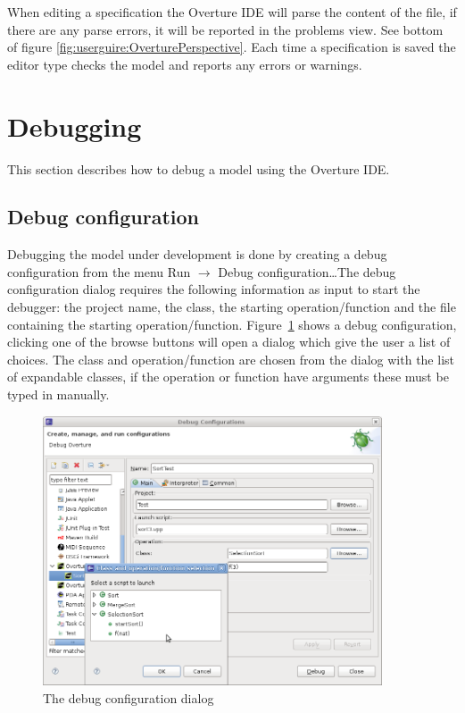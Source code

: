 When editing a specification the Overture IDE will parse the content
of the file, if there are any parse errors, it will be reported in
the problems view. See bottom of figure \ref{fig:userguire:OverturePerspective}.
Each time a specification is saved the editor type checks the model
and reports any errors or warnings.

\section{Debugging}

This section describes how to debug a model using the Overture IDE. 

\subsection{Debug configuration}

Debugging the model under development is done by creating a debug configuration
from the menu Run $ \rightarrow  $ Debug configuration\ldots The debug
configuration dialog requires the following information as input to start the
debugger: the project name, the class, the starting operation/function and the
file containing the starting operation/function.
Figure~\ref{fig:userguide:debugConfiguration} shows a debug configuration,
clicking one of the browse buttons will open a dialog which give the user a list
of choices. The class and operation/function are chosen from the dialog with the
list of expandable classes, if the operation or function have arguments these
must be typed in manually.

\begin{figure}[htp]
\begin{center}
  \includegraphics[width=380px]{figures/debugConfiguration}
  \caption{The debug configuration dialog}
  \label{fig:userguide:debugConfiguration}
\end{center}
\end{figure}

